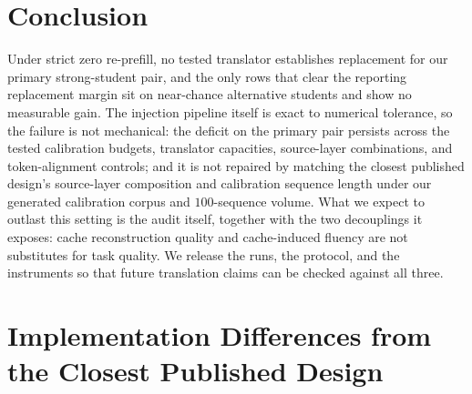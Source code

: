 \documentclass{article} %
\begin{document}

\section{Conclusion}
\label{sec:conclusion}

Under strict zero re-prefill, no tested translator establishes replacement for
our primary strong-student pair, and the only rows that clear the reporting
replacement margin sit on near-chance alternative students and show no
measurable gain. The injection pipeline itself is exact to numerical
tolerance, so the failure is not mechanical: the deficit on the primary pair
persists across the tested calibration
budgets, translator capacities, source-layer combinations, and token-alignment
controls; and it is not repaired by matching the closest published design's
source-layer composition and calibration sequence length under our generated
calibration corpus and $100$-sequence volume. What we expect to outlast this
setting is the audit itself, together with the two decouplings it exposes: cache
reconstruction quality and cache-induced fluency are not substitutes for task
quality. We release the runs, the protocol, and the instruments so that future
translation claims can be checked against all three.





\appendix

\section{Implementation Differences from the Closest Published Design}
\label{app:impl}

\begin{table}[h]
\centering
\caption{Our implementation of the closest strict-zero-re-prefill design
\citep{heo2026} and where it differs from the reference. Both configurations of
our implementation fail (Table~\ref{tab:main}).}
\label{tab:impl}
\end{table}
\end{document}
